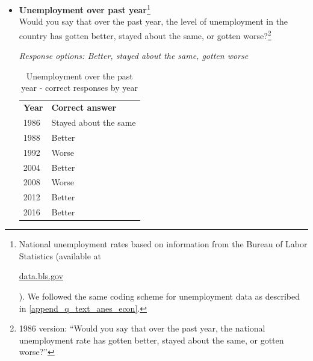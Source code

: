 \documentclass[12pt, letterpaper]{article}
\begin{document}
\vspace{.1in}

\large {}

\vspace{.2in}

\normalsize
   \begin{itemize}
\item \textbf{Unemployment over past year}\footnote{National unemployment rates based on information from the Bureau of Labor Statistics (available at \begin{footnotesize} \url{data.bls.gov} \end{footnotesize}). We followed the same coding scheme for unemployment data as described in \ref{append_q_text_anes_econ}.}  \\
Would you say that over the past year, the level of unemployment in the country has gotten better, stayed about the same, or gotten worse?\footnote{1986 version: ``Would you say that over the past year, the national unemployment rate has gotten better, stayed about the same, or gotten worse?''} 

\textit{Response options: Better, stayed about the same, gotten worse} 

         \begin{table}[H]
\centering
\caption{Unemployment over the past year - correct responses by year}
\vspace{.1in}
\label{unemp_corr_by_year}
\begin{tabular}{ll}
\textbf{Year} & \textbf{Correct answer}       \\
1986 & Stayed about the same                 \\
1988 & Better                 \\
1992 & Worse \\
2004 & Better \\
2008 & Worse \\
2012 & Better                 \\
2016 & Better \\
\end{tabular}
\end{table}
   \end{itemize}       
\end{document}
